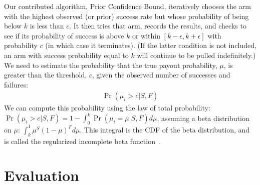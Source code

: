 \documentclass[conference,onecolumn]{IEEEtran}
\newcommand{\algorithmDTxt}{Prior Confidence Bound\xspace}
\begin{document}
Our contributed algorithm, \algorithmDTxt, iteratively chooses the arm
with the highest observed (or prior) success rate but whose
probability of being below $k$ is less than $c$. It then tries that
arm, records the results, and checks to see if its probability of
success is above $k$ or within $[k-\epsilon, k+\epsilon]$ with
probability $c$ (in which case it terminates). (If the latter
condition is not included, an arm with success probability equal to
$k$ will continue to be pulled indefinitely.)  We need to estimate the
probability that the true payout probability, $\mu$, is greater than
the threshold, $c$, given the observed number of successes and
failures:
\begin{align}
\Pr(\mu_i > c|  S, F)
\end{align}
\noindent We can compute this probability using the law of total
probability: $\Pr(\mu_i > c| S, F) = 1 - \int_0^k \Pr(\mu_i=\mu | S,
F) d\mu$, assuming a beta distribution on $\mu$: $\int_k^1 \mu^S (1-
\mu) ^F d\mu$.  This integral is the CDF of the beta distribution, and
is called the regularized incomplete beta function~\citep{olver10}.

\section*{Evaluation}
\end{document}
